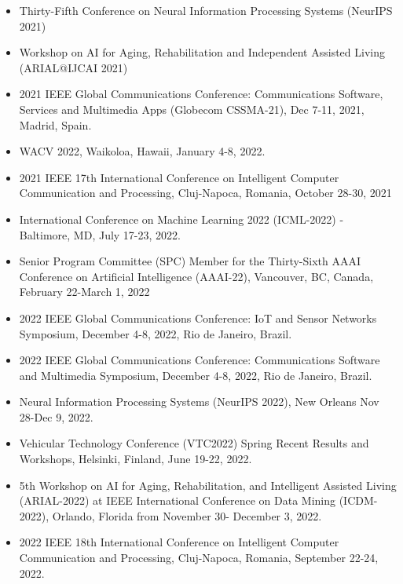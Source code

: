 \begin{itemize}
\item Thirty-Fifth Conference on Neural Information Processing Systems
(NeurIPS 2021)

\item Workshop on AI for Aging, Rehabilitation and Independent
Assisted Living (ARIAL@IJCAI 2021)

\item 2021 IEEE Global Communications Conference: Communications Software, Services and Multimedia Apps (Globecom CSSMA-21), Dec 7-11, 2021, Madrid, Spain.

\item WACV 2022, Waikoloa, Hawaii, January 4-8, 2022.

\item 2021 IEEE 17th International Conference on Intelligent Computer Communication and Processing, Cluj-Napoca, Romania, October 28-30, 2021 

\item International Conference on Machine Learning 2022 (ICML-2022) - Baltimore, MD, July 17-23, 2022.

\item Senior Program Committee (SPC) Member for the Thirty-Sixth AAAI Conference on Artificial Intelligence (AAAI-22), Vancouver, BC, Canada, February 22-March 1, 2022

\item 2022 IEEE Global Communications Conference: IoT and Sensor Networks Symposium, December 4-8, 2022, Rio de Janeiro, Brazil.

\item 2022 IEEE Global Communications Conference:  Communications Software and Multimedia Symposium, December 4-8, 2022, Rio de Janeiro, Brazil.

\item Neural Information Processing Systems (NeurIPS 2022), New Orleans Nov 28-Dec 9, 2022.

\item Vehicular Technology Conference (VTC2022) Spring Recent Results and Workshops, Helsinki, Finland, June 19-22, 2022.

\item 5th Workshop on AI for Aging, Rehabilitation, and Intelligent Assisted Living (ARIAL-2022) at IEEE International Conference on Data Mining (ICDM-2022), Orlando, Florida from November 30- December 3, 2022.

\item 2022 IEEE 18th International Conference on Intelligent Computer Communication and Processing,  Cluj-Napoca, Romania, September 22-24, 2022. 


\end{itemize}
